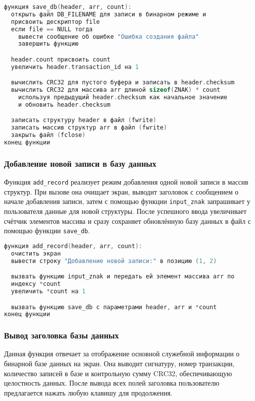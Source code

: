 \begin{lstlisting}[language=C, caption=Функция save\_db]
функция save_db(header, arr, count):
  открыть файл DB_FILENAME для записи в бинарном режиме и 
  присвоить дескриптор file
  если file == NULL тогда
    вывести сообщение об ошибке "Ошибка создания файла"
    завершить функцию

  header.count присвоить count
  увеличить header.transaction_id на 1

  вычислить CRC32 для пустого буфера и записать в header.checksum
  вычислить CRC32 для массива arr длиной sizeof(ZNAK) * count
    используя предыдущий header.checksum как начальное значение
    и обновить header.checksum

  записать структуру header в файл (fwrite)
  записать массив структур arr в файл (fwrite)
  закрыть файл (fclose)
конец функции

\end{lstlisting}

\subsubsection*{Добавление новой записи в базу данных}

Функция \texttt{add\_record} реализует режим добавления одной новой записи в массив структур. При вызове она очищает экран, выводит заголовок с сообщением о начале добавления записи, затем с помощью функции \texttt{input\_znak} запрашивает у пользователя данные для новой структуры. После успешного ввода увеличивает счётчик элементов массива и сразу сохраняет обновлённую базу данных в файл с помощью функции \texttt{save\_db}.

\begin{lstlisting}[language=C, caption=Функция add\_record]
функция add_record(header, arr, count):
  очистить экран
  вывести строку "Добавление новой записи:" в позицию (1, 2)

  вызвать функцию input_znak и передать ей элемент массива arr по 
  индексу *count
  увеличить *count на 1

  вызвать функцию save_db с параметрами header, arr и *count
конец функции
\end{lstlisting}

\subsubsection*{Вывод заголовка базы данных}
Данная функция отвечает за отображение основной служебной информации о бинарной базе данных на экран. Она выводит сигнатуру, номер транзакции, количество записей в базе и контрольную сумму CRC32, обеспечивающую целостность данных. После вывода всех полей заголовка пользователю предлагается нажать любую клавишу для продолжения.

